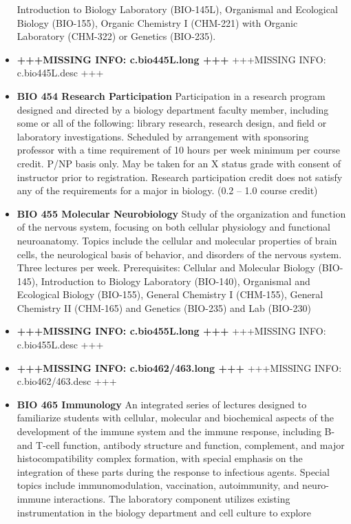 \documentclass[
  letterpaper,
]{scrbook}
\begin{document}
\begin{itemize}
  Introduction to Biology Laboratory (BIO-145L), Organismal and
  Ecological Biology (BIO-155), Organic Chemistry I (CHM-221) with
  Organic Laboratory (CHM-322) or Genetics (BIO-235).
\item
  \textbf{+++MISSING INFO: c.bio445L.long +++} +++MISSING INFO:
  c.bio445L.desc +++
\item
  \textbf{BIO 454 Research Participation} Participation in a research
  program designed and directed by a biology department faculty member,
  including some or all of the following: library research, research
  design, and field or laboratory investigations. Scheduled by
  arrangement with sponsoring professor with a time requirement of 10
  hours per week minimum per course credit. P/NP basis only. May be
  taken for an X status grade with consent of instructor prior to
  registration. Research participation credit does not satisfy any of
  the requirements for a major in biology. (0.2 -- 1.0 course credit)
\item
  \textbf{BIO 455 Molecular Neurobiology} Study of the organization and
  function of the nervous system, focusing on both cellular physiology
  and functional neuroanatomy. Topics include the cellular and molecular
  properties of brain cells, the neurological basis of behavior, and
  disorders of the nervous system. Three lectures per week.
  Prerequisites: Cellular and Molecular Biology (BIO-145), Introduction
  to Biology Laboratory (BIO-140), Organismal and Ecological Biology
  (BIO-155), General Chemistry I (CHM-155), General Chemistry II
  (CHM-165) and Genetics (BIO-235) and Lab (BIO-230)
\item
  \textbf{+++MISSING INFO: c.bio455L.long +++} +++MISSING INFO:
  c.bio455L.desc +++
\item
  \textbf{+++MISSING INFO: c.bio462/463.long +++} +++MISSING INFO:
  c.bio462/463.desc +++
\item
  \textbf{BIO 465 Immunology} An integrated series of lectures designed
  to familiarize students with cellular, molecular and biochemical
  aspects of the development of the immune system and the immune
  response, including B-and T-cell function, antibody structure and
  function, complement, and major histocompatibility complex formation,
  with special emphasis on the integration of these parts during the
  response to infectious agents. Special topics include
  immunomodulation, vaccination, autoimmunity, and neuro-immune
  interactions. The laboratory component utilizes existing
  instrumentation in the biology department and cell culture to explore

\end{itemize}
\end{document}
